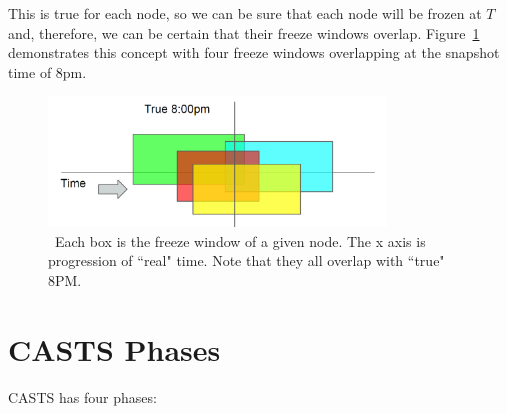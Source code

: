 This is true for each node, so we can be sure that each node will be
frozen at $T$ and, therefore, we can be certain that their freeze
windows overlap. Figure~\ref{fig:overlapping-windows} demonstrates
this concept with four freeze windows overlapping at the snapshot time
of 8pm.

\begin{figure}[!htbp]
  \centering
  \includegraphics[width=0.8\textwidth]{overlapping-windows.png}
  \caption{~Each box is the freeze window of a given node. The x axis is progression of ``real" time. Note that they all overlap with ``true" 8PM.}
  \label{fig:overlapping-windows}
\end{figure}


\section{CASTS Phases}
CASTS has four phases:

